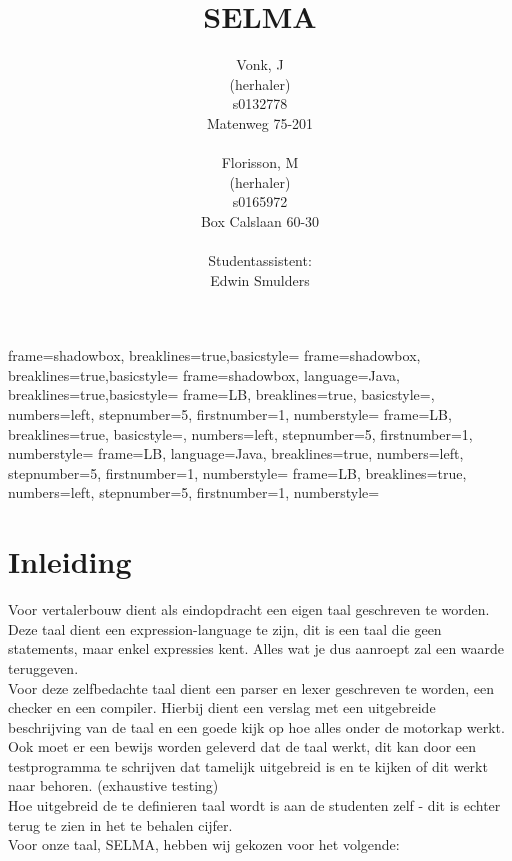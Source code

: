 \documentclass[]{article}
\title{SELMA}
\author{ 
Vonk, J\\
(herhaler)\\
s0132778\\
Matenweg 75-201\\
\\
Florisson, M\\
(herhaler)\\
s0165972\\
Box Calslaan 60-30\\
\\
Studentassistent:\\
Edwin Smulders}
\begin{document}
	{frame=shadowbox, breaklines=true,basicstyle=\footnotesize}
	{frame=shadowbox, breaklines=true,basicstyle=\small}
	{frame=shadowbox, language=Java, breaklines=true,basicstyle=\footnotesize}
	{frame=LB, breaklines=true, basicstyle=\scriptsize, numbers=left, stepnumber=5, firstnumber=1, numberstyle=\tiny}	
	{frame=LB, breaklines=true, basicstyle=\scriptsize, numbers=left, stepnumber=5, firstnumber=1, numberstyle=\tiny}	
	{frame=LB, language=Java, breaklines=true, numbers=left, stepnumber=5, firstnumber=1, numberstyle=\tiny}	
	{frame=LB, breaklines=true, numbers=left, stepnumber=5, firstnumber=1, numberstyle=\tiny}	

\newcommand{\todo}[1]{\marginpar{\fcolorbox{red}{yellow}{\textbf{#1}}}}



\begin{titlepage}
\maketitle 
\end{titlepage}
\setcounter{secnumdepth}{5}
\setcounter{tocdepth}{5}
\tableofcontents{}

\newpage
\section{Inleiding}
Voor vertalerbouw dient als eindopdracht een eigen taal geschreven te worden. Deze taal dient een expression-language te zijn, dit is een taal die geen statements, maar enkel expressies kent. Alles wat je dus aanroept zal een waarde teruggeven.\\
Voor deze zelfbedachte taal dient een parser en lexer geschreven te worden, een checker en een compiler. Hierbij dient een verslag met een uitgebreide beschrijving van de taal en een goede kijk op hoe alles onder de motorkap werkt. Ook moet er een bewijs worden geleverd dat de taal werkt, dit kan door een testprogramma te schrijven dat tamelijk uitgebreid is en te kijken of dit werkt naar behoren. (exhaustive testing) \\
Hoe uitgebreid de te definieren taal wordt is aan de studenten zelf - dit is echter terug te zien in het te behalen cijfer.\\
Voor onze taal, SELMA, hebben wij gekozen voor het volgende:
\end{document}
